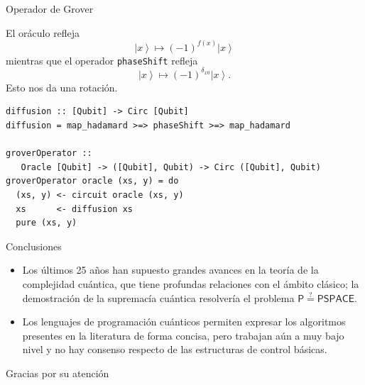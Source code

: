 \documentclass[ignorenonframetext,aspectratio=43,]{beamer}
\newcommand{\ket}[1]{\left|#1\right\rangle}
\newcommand{\qeq}{\overset{?}{=}}
\begin{document}
\begin{frame}[fragile]{Operador de Grover}

  El oráculo refleja $$\ket{x} \mapsto (-1)^{f(x)}\ket{x}$$
  mientras que el operador \texttt{phaseShift} refleja $$\ket{x} \mapsto (-1)^{\delta_{x0}}\ket{x}.$$
  Esto nos da una rotación.

  \begin{lstlisting}
diffusion :: [Qubit] -> Circ [Qubit]
diffusion = map_hadamard >=> phaseShift >=> map_hadamard

groverOperator ::
   Oracle [Qubit] -> ([Qubit], Qubit) -> Circ ([Qubit], Qubit)
groverOperator oracle (xs, y) = do
  (xs, y) <- circuit oracle (xs, y)
  xs      <- diffusion xs
  pure (xs, y)
\end{lstlisting}
\end{frame}


\begin{frame}{Conclusiones}
  \begin{itemize}[<+->]
  \item Los últimos 25 años han supuesto grandes avances en la teoría de la complejidad cuántica, que tiene profundas relaciones con el ámbito clásico; la demostración de la supremacía cuántica resolvería el problema $\mathsf{P} \qeq \mathsf{PSPACE}.$
  \item Los lenguajes de programación cuánticos permiten expresar los algoritmos presentes en la literatura de forma concisa, pero trabajan aún a muy bajo nivel y no hay consenso respecto de las estructuras de control básicas.
  \end{itemize}
\end{frame}

\begin{frame}[standout]

Gracias por su atención
\end{frame}
\end{document}
